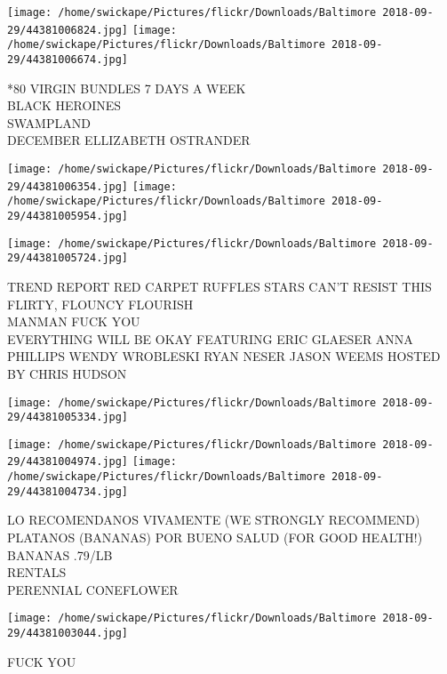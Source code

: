 \documentclass[10pt,letterpaper]{article}
\begin{document}
\texttt{[image: /home/swickape/Pictures/flickr/Downloads/Baltimore 2018-09-29/44381006824.jpg]}
\texttt{[image: /home/swickape/Pictures/flickr/Downloads/Baltimore 2018-09-29/44381006674.jpg]}

*80 VIRGIN BUNDLES 7 DAYS A WEEK\\
BLACK HEROINES\\
SWAMPLAND\\
DECEMBER ELLIZABETH OSTRANDER
\pagebreak

\texttt{[image: /home/swickape/Pictures/flickr/Downloads/Baltimore 2018-09-29/44381006354.jpg]}
\texttt{[image: /home/swickape/Pictures/flickr/Downloads/Baltimore 2018-09-29/44381005954.jpg]}

\texttt{[image: /home/swickape/Pictures/flickr/Downloads/Baltimore 2018-09-29/44381005724.jpg]}

TREND REPORT RED CARPET RUFFLES STARS CAN'T RESIST THIS FLIRTY, FLOUNCY FLOURISH\\
MANMAN FUCK YOU\\
EVERYTHING WILL BE OKAY FEATURING ERIC GLAESER ANNA PHILLIPS WENDY WROBLESKI RYAN NESER JASON WEEMS HOSTED BY CHRIS HUDSON
\pagebreak

\texttt{[image: /home/swickape/Pictures/flickr/Downloads/Baltimore 2018-09-29/44381005334.jpg]}

\vspace{0.25in}
\texttt{[image: /home/swickape/Pictures/flickr/Downloads/Baltimore 2018-09-29/44381004974.jpg]}
\texttt{[image: /home/swickape/Pictures/flickr/Downloads/Baltimore 2018-09-29/44381004734.jpg]}

LO RECOMENDANOS VIVAMENTE (WE STRONGLY RECOMMEND) PLATANOS (BANANAS) POR BUENO SALUD (FOR GOOD HEALTH!) BANANAS .79/LB\\
RENTALS\\
PERENNIAL CONEFLOWER
\pagebreak

\texttt{[image: /home/swickape/Pictures/flickr/Downloads/Baltimore 2018-09-29/44381003044.jpg]}

FUCK YOU
\pagebreak
\end{document}

